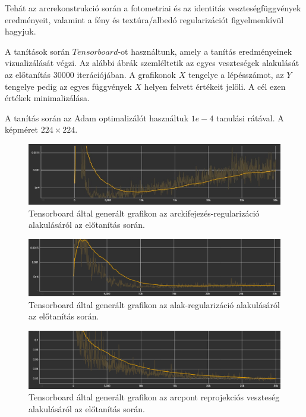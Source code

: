 \documentclass[12pt,a4]{article}
\begin{document}
        Tehát az arcrekonstrukció során a fotometriai és az identitás veszteségfüggvények eredményeit, valamint a fény és textúra/albedó regularizációt figyelmenkívül hagyjuk.

        A tanítások során $Tensorboard$-ot használtunk, amely a tanítás eredményeinek vizualizálását végzi. Az alábbi ábrák szemléltetik az egyes veszteségek alakulását az előtanítás $30000$ iterációjában. A grafikonok $X$ tengelye a lépésszámot, az $Y$ tengelye pedig az egyes függvények $X$ helyen felvett értékeit jelöli. A cél ezen értékek minimalizálása.

        A tanítás során az Adam optimalizálót használtuk $1e-4$ tanulási rátával. A képméret $224 \times 
        224$.

        

        \begin{figure}[h!]	
            \centering
            \includegraphics[width=1\linewidth]{pretrain-exp-reg.jpg}
            \caption{Tensorboard által generált grafikon az arckifejezés-regularizáció alakulásáról az előtanítás során.}
            \label{fig:pretrain-exp-reg}
        \end{figure}

        \begin{figure}[h!]	
            \centering
            \includegraphics[width=1\linewidth]{pretrain-shape-reg.png}
            \caption{Tensorboard által generált grafikon az alak-regularizáció alakulásáról az előtanítás során.}
            \label{fig:pretrain-shape-reg}
        \end{figure}

        \begin{figure}[h!]	
            \centering
            \includegraphics[width=1\linewidth]{pretrain-lmk-loss.png}
            \caption{Tensorboard által generált grafikon az arcpont reprojekciós veszteség alakulásáról az előtanítás során.}
            \label{fig:pretrain-lmk-loss}
        \end{figure}
\end{document}
